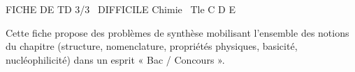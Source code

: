 \documentclass[11pt]{article}
\begin{document}
\begin{tcolorbox}[enhanced,colback=popink,colframe=popink,arc=10pt,boxrule=0pt,left=12pt,right=12pt,top=9pt,bottom=9pt]
{\color{white}\popxbold\small FICHE DE TD 3/3 \textbullet\ DIFFICILE \hfill Chimie \textbullet\ Tle C D E\par}
\end{tcolorbox}
\vspace{4pt}
Cette fiche propose des problèmes de synthèse mobilisant l'ensemble des notions du chapitre (structure, nomenclature, propriétés physiques, basicité, nucléophilicité) dans un esprit « Bac / Concours ».
\end{document}
